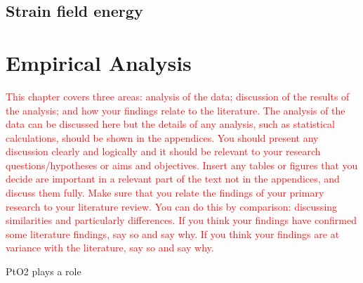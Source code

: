 \subsection{Strain field energy}


\section{Empirical Analysis}

\textcolor{red}{This chapter covers three areas: analysis of the data; discussion of the results of the analysis; and how your findings relate to the literature. The analysis of the data can be discussed here but the details of any analysis, such as statistical calculations, should be shown in the appendices. You should present any discussion clearly and logically and it should be relevant to your research questions/hypotheses or aims and objectives. Insert any tables or figures that you decide are important in a relevant part of the text not in the appendices, and discuss them fully. Make sure that you relate the findings of your primary research to your literature review. You can do this by comparison: discussing similarities and particularly differences. If you think your findings have confirmed some literature findings, say so and say why. If you think your findings are at variance with the literature, say so and say why.}


PtO2 plays a role \cite{McCabe1986, HANNEVOLD2005}